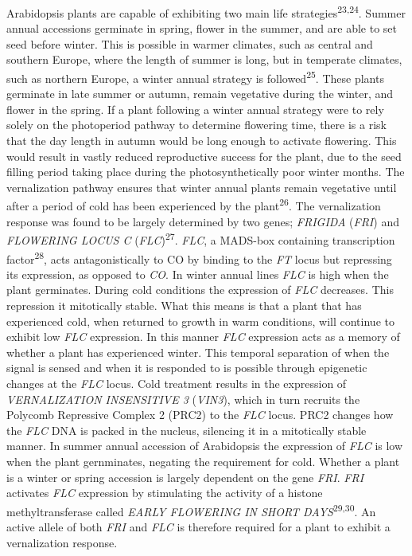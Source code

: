 \documentclass[12pt,]{book}
\begin{document}
Arabidopsis plants are capable of exhibiting two main life
strategies\textsuperscript{23,24}. Summer annual accessions germinate in
spring, flower in the summer, and are able to set seed before winter.
This is possible in warmer climates, such as central and southern
Europe, where the length of summer is long, but in temperate climates,
such as northern Europe, a winter annual strategy is
followed\textsuperscript{25}. These plants germinate in late summer or
autumn, remain vegetative during the winter, and flower in the spring.
If a plant following a winter annual strategy were to rely solely on the
photoperiod pathway to determine flowering time, there is a risk that
the day length in autumn would be long enough to activate flowering.
This would result in vastly reduced reproductive success for the plant,
due to the seed filling period taking place during the
photosynthetically poor winter months. The vernalization pathway ensures
that winter annual plants remain vegetative until after a period of cold
has been experienced by the plant\textsuperscript{26}. The vernalization
response was found to be largely determined by two genes; \emph{FRIGIDA}
(\emph{FRI}) and \emph{FLOWERING LOCUS C}
(\emph{FLC})\textsuperscript{27}. \emph{FLC}, a MADS-box containing
transcription factor\textsuperscript{28}, acts antagonistically to CO by
binding to the \emph{FT} locus but repressing its expression, as opposed
to \emph{CO}. In winter annual lines \emph{FLC} is high when the plant
germinates. During cold conditions the expression of \emph{FLC}
decreases. This repression it mitotically stable. What this means is
that a plant that has experienced cold, when returned to growth in warm
conditions, will continue to exhibit low \emph{FLC} expression. In this
manner \emph{FLC} expression acts as a memory of whether a plant has
experienced winter. This temporal separation of when the signal is
sensed and when it is responded to is possible through epigenetic
changes at the \emph{FLC} locus. Cold treatment results in the
expression of \emph{VERNALIZATION INSENSITIVE 3} (\emph{VIN3}), which in
turn recruits the Polycomb Repressive Complex 2 (PRC2) to the \emph{FLC}
locus. PRC2 changes how the \emph{FLC} DNA is packed in the nucleus,
silencing it in a mitotically stable manner. In summer annual accession
of Arabidopsis the expression of \emph{FLC} is low when the plant
gernminates, negating the requirement for cold. Whether a plant is a
winter or spring accession is largely dependent on the gene \emph{FRI}.
\emph{FRI} activates \emph{FLC} expression by stimulating the activity
of a histone methyltransferase called \emph{EARLY FLOWERING IN SHORT
DAYS}\textsuperscript{29,30}. An active allele of both \emph{FRI} and
\emph{FLC} is therefore required for a plant to exhibit a vernalization
response.
\end{document}
